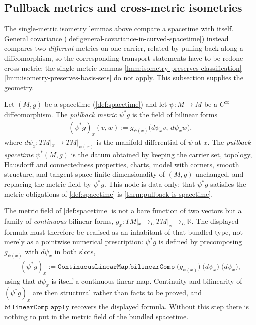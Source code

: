 \medskip

\subsection{Pullback metrics and cross-metric isometries}

The single-metric isometry lemmas above compare a spacetime with itself. General covariance (\ref{def:general-covariance-in-curved-spacetime}) instead compares two \emph{different} metrics on one carrier, related by pulling back along a diffeomorphism, so the corresponding transport statements have to be redone cross-metric; the single-metric lemmas \ref{lmm:isometry-preserves-classification}--\ref{lmm:isometry-preserves-basis-sets} do not apply. This subsection supplies the geometry.

\begin{definition}
    \label{def:pullback-metric}
    \leanok
    Let $(M,g)$ be a spacetime (\ref{def:spacetime}) and let $\psi : M \to M$ be a $C^\infty$ diffeomorphism. The \emph{pullback metric} $\psi^*g$ is the field of bilinear forms
    \begin{align}
        (\psi^*g)_x(v,w) := g_{\psi(x)}\big(d\psi_x v,\, d\psi_x w\big),
    \end{align}
    where $d\psi_x : TM|_x \to TM|_{\psi(x)}$ is the manifold differential of $\psi$ at $x$. The \emph{pullback spacetime} $\psi^*(M,g)$ is the datum obtained by keeping the carrier set, topology, Hausdorff and connectedness properties, charts, model with corners, smooth structure, and tangent-space finite-dimensionality of $(M,g)$ unchanged, and replacing the metric field by $\psi^*g$. This node is data only: that $\psi^*g$ satisfies the metric obligations of \ref{def:spacetime} is \ref{thrm:pullback-is-spacetime}.

    The metric field of \ref{def:spacetime} is not a bare function of two vectors but a family of \emph{continuous} bilinear forms, $g_x : TM|_x \to_L TM|_x \to_L \mathbb{R}$. The displayed formula must therefore be realised as an inhabitant of that bundled type, not merely as a pointwise numerical prescription: $\psi^*g$ is defined by precomposing $g_{\psi(x)}$ with $d\psi_x$ in both slots,
    \begin{align}
        (\psi^*g)_x := \mathtt{ContinuousLinearMap.bilinearComp}\;\big(g_{\psi(x)}\big)\;\big(d\psi_x\big)\;\big(d\psi_x\big),
    \end{align}
    using that $d\psi_x$ is itself a continuous linear map. Continuity and bilinearity of $(\psi^*g)_x$ are then structural rather than facts to be proved, and $\mathtt{bilinearComp\_apply}$ recovers the displayed formula. Without this step there is nothing to put in the metric field of the bundled spacetime.
\end{definition}

